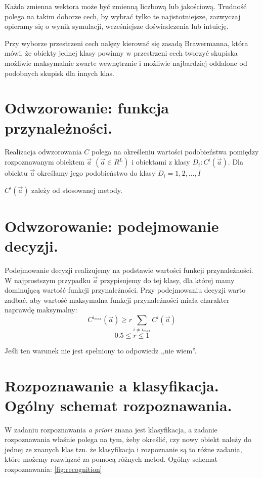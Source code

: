 \documentclass[a4paper,10pt]{article}
\begin{document}
Każda zmienna wektora może być zmienną liczbową lub jakościową. Trudność polega na takim doborze cech, by wybrać tylko te najistotniejsze, zazwyczaj opieramy się o wynik symulacji, wcześniejsze doświadczenia lub intuicję.

Przy wyborze przestrzeni cech nalęzy kierować się zasadą Brawermanna, która mówi, że obiekty jednej klasy powinny w przestrzeni cech tworzyć skupiska możliwie maksymalnie zwarte wewnętrznie i możliwie najbardziej oddalone od podobnych skupisk dla innych klas.

\section{Odwzorowanie: funkcja przynależności.}
Realizacja odwzorowania $C$ polega na określeniu wartości podobieństwa pomiędzy rozpoznawanym obiektem $\overrightarrow{a}$ $(\overrightarrow{a} \in R^L)$ i obiektami z klasy $D_i: C^i(\overrightarrow{a})$. Dla obiektu $\overrightarrow{a}$ określamy jego podobieństwo do klasy $D_i = 1, 2, \ldots, I$

$C^i(\overrightarrow{a})$ zależy od stosowanej metody.

\section{Odwzorowanie: podejmowanie decyzji.}
Podejmowanie decyzji realizujemy na podstawie wartości funkcji przynależności. W najprostszym przypadku $\overrightarrow{a}$ przypisujemy do tej klasy, dla której mamy dominującą wartość funkcji przynależności. Przy podejmowaniu decyzji warto zadbać, aby wartość maksymalna funkcji przynależności miała charakter naprawdę maksymalny:
\begin{equation}
C^{i_{max}}(\overrightarrow{a}) \geq r \sum_{i \neq i_{max}} C^i(\overrightarrow{a})
\end{equation}
\begin{equation}
 0.5 \leq r \leq 1
\end{equation}

Jeśli ten warunek nie jest spełniony to odpowiedz ,,nie wiem''.

\section{Rozpoznawanie a klasyfikacja. Ogólny schemat rozpoznawania.}
W zadaniu rozpoznawania \textit{a priori} znana jest klasyfikacja, a zadanie rozpoznawania właśnie polega na tym, żeby określić, czy nowy obiekt należy do jednej ze znanych klas tzn. że klasyfikacja i rozpoznanie są to różne zadania, które możemy rozwiązać za pomocą różnych metod.
Ogólny schemat rozpoznawania: \ref{fig:recognition}
\end{document}
